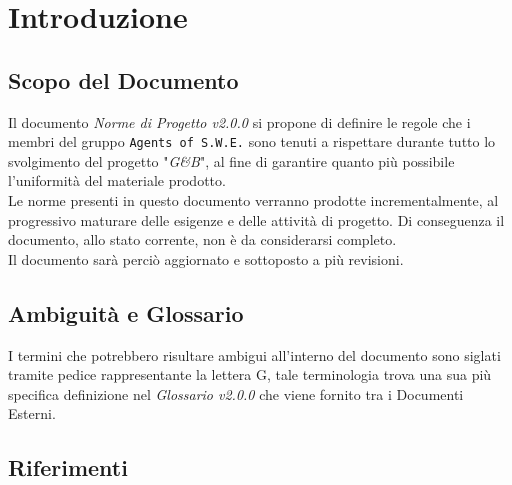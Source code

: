 \section{Introduzione}\label{Intro}

\subsection{Scopo del Documento}
Il documento \textit{Norme di Progetto v2.0.0} si propone di definire le regole che i membri del gruppo \texttt{Agents of S.W.E.} sono tenuti a rispettare durante tutto lo svolgimento del progetto "\textit{G\&B}", al fine di garantire quanto più possibile l'uniformità del materiale prodotto.\\
Le norme presenti in questo documento verranno prodotte incrementalmente, al progressivo maturare delle esigenze e delle attività di progetto. Di conseguenza il documento, allo stato corrente, non è da considerarsi completo.\\
Il documento sarà perciò aggiornato e sottoposto a più revisioni.

\subsection{Ambiguità e Glossario}
I termini che potrebbero risultare ambigui all'interno del documento sono siglati tramite pedice rappresentante la lettera \textmd{G}, tale terminologia trova una sua più specifica definizione nel \textit{Glossario v2.0.0} che viene fornito tra i Documenti Esterni.

\subsection{Riferimenti}\label{Riferimenti}
